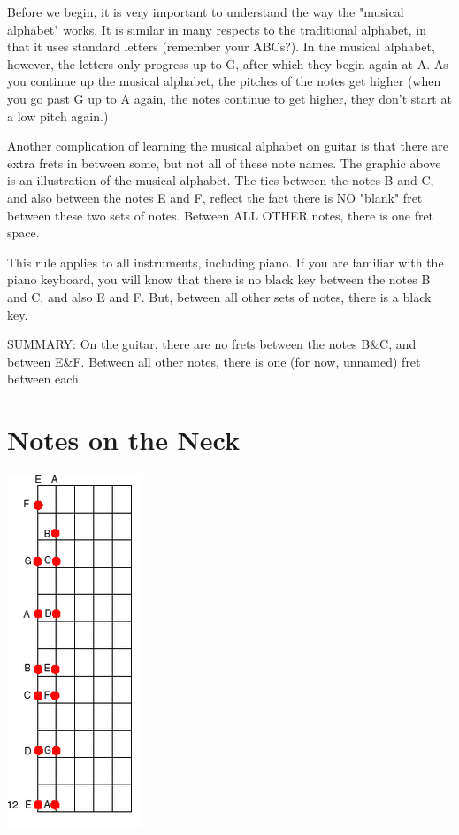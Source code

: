 Before we begin, it is very important to understand the way the "musical alphabet" works. It is similar in many respects to the traditional alphabet, in that it uses standard letters (remember your ABCs?). In the musical alphabet, however, the letters only progress up to G, after which they begin again at A. As you continue up the musical alphabet, the pitches of the notes get higher (when you go past G up to A again, the notes continue to get higher, they don't start at a low pitch again.)

Another complication of learning the musical alphabet on guitar is that there are extra frets in between some, but not all of these note names. The graphic above is an illustration of the musical alphabet. The ties between the notes B and C, and also between the notes E and F, reflect the fact there is NO "blank" fret between these two sets of notes. Between ALL OTHER notes, there is one fret space.

This rule applies to all instruments, including piano. If you are familiar with the piano keyboard, you will know that there is no black key between the notes B and C, and also E and F. But, between all other sets of notes, there is a black key.

SUMMARY: On the guitar, there are no frets between the notes B\&C, and between E\&F. Between all other notes, there is one (for now, unnamed) fret between each.

\section{Notes on the Neck}
\includegraphics{partfour/fretboard.png}

